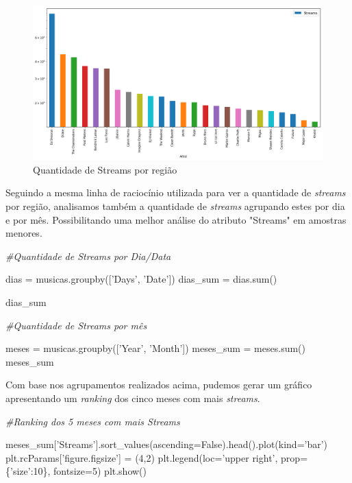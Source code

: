 \documentclass[11pt]{article}
\makeatletter
\def\maxwidth{\ifdim\Gin@nat@width>\linewidth\linewidth
    \else\Gin@nat@width\fi}
\let\Oldincludegraphics\includegraphics
\renewcommand{\includegraphics}[1]{\Oldincludegraphics[width=.8\maxwidth]{#1}}
\newenvironment{Shaded}{}{}
\newcommand{\DecValTok}[1]{\textcolor[rgb]{0.25,0.63,0.44}{{#1}}}
\newcommand{\StringTok}[1]{\textcolor[rgb]{0.25,0.44,0.63}{{#1}}}
\newcommand{\CommentTok}[1]{\textcolor[rgb]{0.38,0.63,0.69}{\textit{{#1}}}}
\newcommand{\NormalTok}[1]{{#1}}
\newcommand{\VariableTok}[1]{\textcolor[rgb]{0.10,0.09,0.49}{{#1}}}
\newcommand{\OperatorTok}[1]{\textcolor[rgb]{0.40,0.40,0.40}{{#1}}}
\newcommand{\BuiltInTok}[1]{{#1}}
\makeatother
\begin{document}
\begin{figure}
\centering
\includegraphics{output_9_0.png}
\caption{Quantidade de Streams por região}
\end{figure}

    Seguindo a mesma linha de raciocínio utilizada para ver a quantidade de
\emph{streams} por região, analisamos também a quantidade de
\emph{streams} agrupando estes por dia e por mês. Possibilitando uma
melhor análise do atributo "Streams" em amostras menores.

    \begin{Shaded}
\begin{Highlighting}[]
    \CommentTok{#Quantidade de Streams por Dia/Data}

\NormalTok{dias }\OperatorTok{=}\NormalTok{ musicas.groupby([}\StringTok{'Days'}\NormalTok{, }\StringTok{'Date'}\NormalTok{])}
\NormalTok{dias_sum }\OperatorTok{=}\NormalTok{ dias.}\BuiltInTok{sum}\NormalTok{()}

\NormalTok{dias_sum}

    \CommentTok{#Quantidade de Streams por mês}

\NormalTok{meses }\OperatorTok{=}\NormalTok{ musicas.groupby([}\StringTok{'Year'}\NormalTok{, }\StringTok{'Month'}\NormalTok{])}
\NormalTok{meses_sum }\OperatorTok{=}\NormalTok{ meses.}\BuiltInTok{sum}\NormalTok{()}
\NormalTok{meses_sum}
\end{Highlighting}
\end{Shaded}

    Com base nos agrupamentos realizados acima, pudemos gerar um gráfico
apresentando um \emph{ranking} dos cinco meses com mais \emph{streams}.

    \begin{Shaded}
\begin{Highlighting}[]
    \CommentTok{#Ranking dos 5 meses com mais Streams}

\NormalTok{meses_sum[}\StringTok{'Streams'}\NormalTok{].sort_values(ascending}\OperatorTok{=}\VariableTok{False}\NormalTok{).head().plot(kind}\OperatorTok{=}\StringTok{'bar'}\NormalTok{)}
\NormalTok{plt.rcParams[}\StringTok{'figure.figsize'}\NormalTok{] }\OperatorTok{=}\NormalTok{ (}\DecValTok{4}\NormalTok{,}\DecValTok{2}\NormalTok{)}
\NormalTok{plt.legend(loc}\OperatorTok{=}\StringTok{'upper right'}\NormalTok{, prop}\OperatorTok{=}\NormalTok{\{}\StringTok{'size'}\NormalTok{:}\DecValTok{10}\NormalTok{\}, fontsize}\OperatorTok{=}\DecValTok{5}\NormalTok{)}
\NormalTok{plt.show()}
\end{Highlighting}
\end{Shaded}
\end{document}
